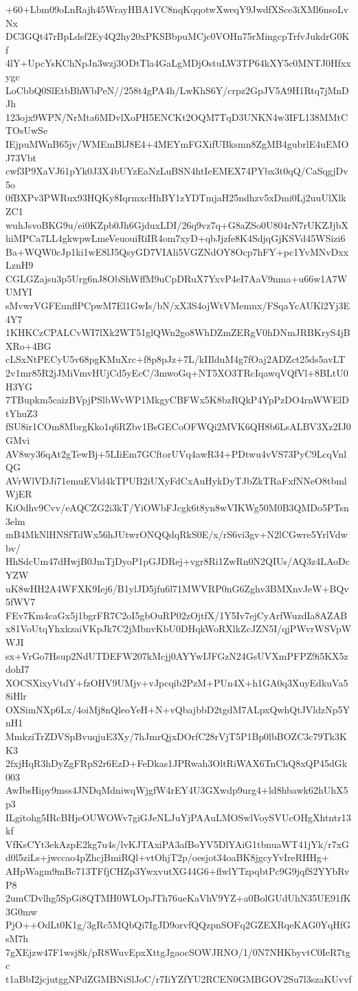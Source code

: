 +60+Lbm09oLnRajh45WrayHBA1VC8nqKqqotwXweqY9JwdfXSce3iXMl6nsoLvNx
DC3GQt47rBpLdsf2Ey4Q2hy20xPKSBbpuMCjc0VOHn75rMingcpTrfvJukdrG0Kf
4lY+UpcYsKChNpJn3wzj3ODtTla4GaLgMDjOstuLW3TP64kXY5c0MNTJ0Hfxxygc
LoCbbQ0SlEtbBhWbPeN//258t4gPA4h/LwKhS6Y/crpz2GpJV5A9H1Rtq7jMnDJh
123ojx9WPN/NrMta6MDvlXoPH5ENCKt2OQM7TqD3UNKN4w3IFL138MMtCTOsUwSe
IEjpuMWnB65jv/WMEmBlJ8E4+4MEYmFGXifUBksmn8ZgMB4gubrlE4uEMOJ73Vbt
cwf3P9XaVJ61pYk0J3X4bUYzEaNzLuBSN4htIeEMEX74PYbx3t0qQ/CaSqgjDv5o
0fBXPv3PWRux93HQKy8IqrmxcHhBY1zYDTmjaH25ndhzv5xDmi0Lj2uuUlXlkZC1
wuhJsvoBKG9u/ei0KZpb0Jh6GjduxLDI/26q9vz7q+G8aZSo0U804rN7rUKZJjbX
hiMPCa7LL4gkwpwLmeVeuouiRiIR4om7xyD+qbJjzfe8K4SdjqGjKSVd45WSizi6
Ba+WQW0cJp1ki1wE8lJ5QsyGD7VIAli5VGZNdOY8Ocp7hFY+pc1YvMNvDxxLznH9
CGLGZajsu3p5Urg6nJ8ObShWffM9uCpDRuX7YxvP4eI7AaV9nma+u66w1A7WUMYI
sMvwrVGFEunflPCpwM7El1GwIs/bN/xX3S4ojWtVMemnx/FSqaYcAUKl2Yj3E4Y7
1KHKCzCPALCvWI7lXk2WT51glQWn2go8WhDZmZERgV0hDNmJRBKryS4jBXRo+4BG
cLSxNtPECyU5v68pgKMuXrc+f8p8pJz+7L/kIIlduM4g7fOaj2ADZct25ds5avLT
2v1mr85R2jJMiVmvHUjCd5yEcC/3mwoGq+NT5XO3TRcIqawqVQfVl+8BLtU0H3YG
7TBupkm5caizBVpjPSlbWvWP1MkgyCBFWx5K8bzRQkP4YpPzDO4rnWWElDtYhuZ3
fSU8ir1COm8MbrgKko1q6RZbv1BsGECoOFWQi2MVK6QH8b6LsALBV3Xz2IJ0GMvi
AV8wy36qAt2gTewBj+5LIiEm7GCftorUVq4awR34+PDtwu4vVS73PyC9LcqVnlQG
AVrWlVDJi71emuEVld4kTPUB2iUXyFdCxAuHykDyTJbZkTRaFxfNNeO8tbmlWjER
KiOdhv9Cvv/eAQCZG2i3kT/YiOWbFJcgk6t8yn8wVIKWg50M0B3QMDo5PTsn3elm
mB4MkNlHNSfTdWx56hJUtwrONQQdqRkS0E/x/rS6vi3gv+N2lCGwre5YrlVdwbv/
HhSdcUm47dHwjB0JmTjDyoP1pGJDRej+vgr8Ri1ZwRn0N2QIUs/AQ3z4LAoDcYZW
uK8wHH2A4WFXK9Iej6/B1ylJD5jfu6l71MWVRP0nG6Zghv3BMXnvJeW+BQv5fWV7
FEv7Km4caGx5j1bgrFR7C2oI5gbOuRP02zOjtfX/1Y5Iv7ejCyArfWuzdIa8AZAB
x81VoUtqYhxkzaiVKpJk7C2jMbnvKbU0DHqkWoRXlkZcJZN5I/qjPWvrWSVpWWJI
sx+VrGo7Hsup2NdUTDEFW207kMcjj0AYYwIJFGzN24GsUVXmPFPZ9i5KX5zdohI7
XOCSXixyVtdY+fzOHV9UMjv+vJpcqib2PzM+PUn4X+h1GA0q3XuyEdkuVa58iHlr
OXSimNXp6Lx/4oiMj8nQleoYeH+N+vQbajbbD2tgdM7ALpxQwhQtJVldzNp5YnH1
MmkziTrZDVSpBvuqjuE3Xy/7hJmrQjxDOrfC28rVjT5P1Bp0lbBOZC3c79Tk3KK3
2fxjHqR3hDyZgFRpS2r6EzD+FeDkas1JPRwah3OltRiWAX6TnChQ8xQP45dGk003
AwIbsHipy9mss4JNDqMdniwqWjgfW4rEY4U3GXwdp9urg4+ld8hbawk62hUhX5p3
ILgitohg5IRcBHjeOUWOWv7giGJeNLJuYjPAAuLMOSwlVoySVUcOHgXhtntr13kf
VfKsCYt3ekAzpE2kg7u4s/lvKJTAxiPA3afBoYV5DlYAiG1tbnuaWT41jYk/r7xG
d0l5ziLs+jwccao4pZhcjBmiRQl+vtOhjT2p/oesjot34oaBK8jgcyYvIreRHHg+
AHpWagm9mBc713TFfjCHZp3YwxvutXG44G6+flwlYTzpqbtPc9G9jqfS2YYbRvP8
2umCDvlhg5SpGi8QTMH0WLOpJTh76ueKaVhV9YZ+a0BolGUdUhN35UE91fK3G0mw
PjO++OdLt0K1g/3gRc5MQbQi7IgJD9orvfQQzpnSOFq2GZEXRqeKAG0YqHfGsM7h
7gXEjzw47F1wsj8k/pR8WuvEpxXttgJgaocSOWJRNO/1/0N7NHKbyvtC0IeR7tgc
t1aBbI2jcjutggNPdZGMBNiSlJoC/r7IiYZfYU2RCEN0GMBGOV2Su7l3szaKUvvf

